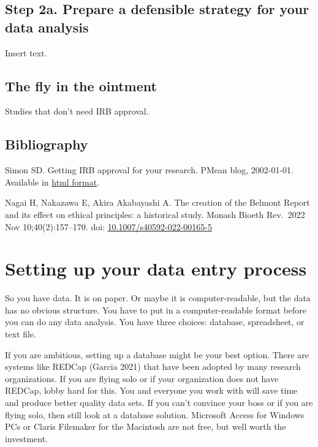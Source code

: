 \documentclass[
  letterpaper,
  DIV=11,
  numbers=noendperiod]{scrreprt}
\begin{document}
\section{Step 2a. Prepare a defensible strategy for your data
analysis}\label{step-2a.-prepare-a-defensible-strategy-for-your-data-analysis}

Insert text.

\section{The fly in the ointment}\label{the-fly-in-the-ointment-4}

Studies that don't need IRB approval.

\section{Bibliography}\label{bibliography-7}

Simon SD. Getting IRB approval for your research. PMean blog,
2002-01-01. Available in
\href{http://pmean.com/posts/getting-irb-approval/}{html format}.

Nagai H, Nakazawa E, Akira Akabayashi A. The creation of the Belmont
Report and its effect on ethical principles: a historical study. Monash
Bioeth Rev.~2022 Nov 10;40(2):157--170. doi:
\href{https://doi.org/10.1007/s40592-022-00165-5}{10.1007/s40592-022-00165-5}


\chapter{Setting up your data entry
process}\label{setting-up-your-data-entry-process}

So you have data. It is on paper. Or maybe it is computer-readable, but
the data has no obvious structure. You have to put in a
computer-readable format before you can do any data analysis. You have
three choices: database, spreadsheet, or text file.

If you are ambitious, setting up a database might be your best option.
There are systems like REDCap (Garcia 2021) that have been adopted by
many research organizations. If you are flying solo or if your
organization does not have REDCap, lobby hard for this. You and everyone
you work with will save time and produce better quality data sets. If
you can't convince your boss or if you are flying solo, then still look
at a database solution. Microsoft Access for Windows PCs or Claris
Filemaker for the Macintosh are not free, but well worth the investment.
\end{document}
